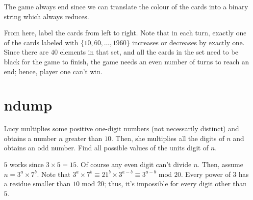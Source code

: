   The game always end since we can translate the colour of the 
  cards into a binary string which always reduces. 

  From here, label the cards from left to right. 
  Note that in each turn, exactly one of the cards labeled with 
  $\{10, 60, \dots, 1960\}$ increases or decreases by 
  exactly one. Since there are $40$ elements in that set, and 
  all the cards in the set need to be black for the game to 
  finish, the game needs an even number of turns to reach an end; 
  hence, player one can't win. 

\section{ndump}

\begin{problem}
  Lucy multiplies some positive one-digit numbers (not necessarily distinct)
  and obtains a number $n$ greater than $10$.
  Then, she multiplies all the digits of $n$ and obtains an odd number.
  Find all possible values of the units digit of $n$.
\end{problem}

  $5$ works since $3 \times 5 = 15$. Of course any even digit 
  can't divide $n$. Then, assume $n = 3^a \times 7^b$. 
  Note that $3^a \times 7^b \equiv 21^{b} \times 3^{a-b} \equiv 
  3^{a-b}$ mod $20$. Every power of $3$ has a residue smaller 
  than $10$ mod $20$; thus, it's impossible for every digit 
  other than $5$.  
